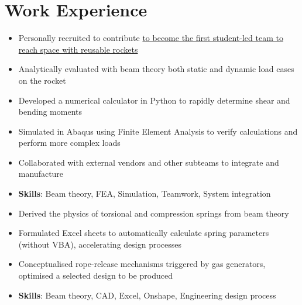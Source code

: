 \documentclass{cv}
\begin{document}
\section{Work Experience}
\begin{subsections}
    \subtitle{Karman Space Programme \hfill London, United Kingdom}
    \begin{itemize}
        \item Personally recruited to contribute \href{https://www.karmanspace.co.uk/}{to become the first student-led team to reach space with reusable rockets}
        \item Analytically evaluated with beam theory both static and dynamic load cases on the rocket
        \item Developed a numerical calculator in Python to rapidly determine shear and bending moments
        \item Simulated in Abaqus using Finite Element Analysis to verify calculations and perform more complex loads
        \item Collaborated with external vendors and other subteams to integrate and manufacture
        \item \textbf{Skills}: Beam theory, FEA, Simulation, Teamwork, System integration
    \end{itemize}

    \subtitle{Guided Systems, DSO National Laboratories \hfill Singapore}
    \begin{itemize}
        \item Derived the physics of torsional and compression springs from beam theory
        \item Formulated Excel sheets to automatically calculate spring parameters (without VBA), accelerating design processes
        \item Conceptualised rope-release mechanisms triggered by gas generators, optimised a selected design to be produced
        \item \textbf{Skills}: Beam theory, CAD, Excel, Onshape, Engineering design process
    \end{itemize}


\end{subsections}
\end{document}

